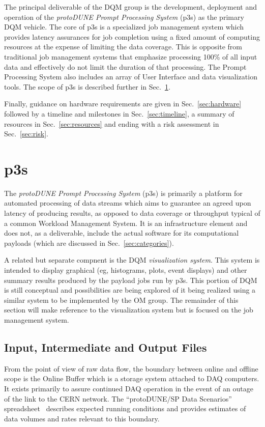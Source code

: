 \documentclass[pdftex,12pt,letter]{article}
\newcommand{\pd}{protoDUNE\xspace}
\begin{document}
The principal deliverable of the DQM group is the development, deployment and operation
of the \textit{\pd Prompt   Processing System} (p3s) as the primary DQM vehicle. The core of 
p3s is a specialized job management system which provides
latency assurances for job completion using a fixed amount of
computing resources at the expense of limiting the data coverage.
This is opposite from traditional job management systems that
emphasize processing 100\% of all input data and effectively do not limit the
duration of that processing. The Prompt Processing System also includes
an array of User Interface and data visualization tools.
The scope of p3s is described further in Sec.~\ref{sec:p3sscope}.

Finally, guidance on hardware requirements are given in
Sec.~\ref{sec:hardware} followed by a timeline and milestones in
Sec.~\ref{sec:timeline}, a summary of resources in
Sec.~\ref{sec:resources} and ending with a risk assessment in
Sec.~\ref{sec:risk}.



\section{p3s}
\label{sec:p3sscope}
The \textit{\pd Prompt Processing System} (p3s) is primarily a
platform for automated processing of data streams which
aims to  guarantee an agreed upon latency of producing results,
as opposed to data coverage or
throughput typical of a common Workload Management System.
It is an infrastructure element and does not, as a
deliverable, include the actual software for its computational
payloads (which are discussed in Sec.~\ref{sec:categories}).

A related but separate compnent  is the DQM
\textit{visualization system}.  This system is intended to display
graphical (eg, histograms, plots, event displays) and other summary
results produced by the payload jobs run by p3s.  This portion of DQM
is still conceptual and possibilities are being explored of it being realized
using a similar system to be implemented by the OM group.  The remainder
of this section will make reference to the visualization system but is
focused on the job management system.


\subsection{Input, Intermediate and Output Files}
\label{sec:io}

From the point of view of raw data flow, the boundary between online
and offline scope is the Online Buffer which is a storage system
attached to DAQ computers.  It exists primarily to assure continued
DAQ operation in the event of an outage of the link to the CERN
network.  The ``\pd/SP Data Scenarios'' spreadsheet~\cite{docdb1086}
describes expected running conditions and provides estimates of data
volumes and rates relevant to this boundary.
\end{document}
